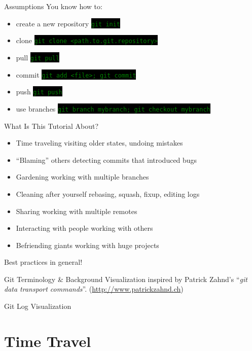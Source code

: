 \documentclass[
14pt,
aspectratio=169,
usenames,
dvipsnames,
x11names]{beamer}
\newcommand{\code}[1]{{\small\setlength{\fboxsep}{2pt}\colorbox{black}{\textcolor{green}{\texttt{#1}}}}}
\newcommand{\buz}[2]{#1 \hfill \textcolor{Gray!50}{#2}}
\begin{document}
\begin{frame}{Assumptions}
  \alert{You} know how to:
  \begin{itemize}
  \item create a new repository \hfill \code{git init}
  \item clone \hfill \code{git clone <path.to.git.repository>}
  \item pull \hfill \code{git pull}
  \item commit \hfill \code{git add <file>; git commit}
  \item push \hfill \code{git push}
  \item use branches \hfill \code{git branch mybranch; git checkout mybranch}
  \end{itemize}
\end{frame}

\begin{frame}{What Is This Tutorial About?}
  \begin{itemize} \setlength{\itemsep}{\fill}
  \item \buz{Time traveling}{visiting older states, undoing mistakes}
  \item \buz{``Blaming'' others}{detecting commits that introduced bugs}
  \item \buz{Gardening}{working with multiple branches}
  \item \buz{Cleaning after yourself}{rebasing, squash, fixup, editing logs}
  \item \buz{Sharing}{working with multiple remotes}
  \item \buz{Interacting with people}{working with others}
  \item \buz{Befriending giants}{working with huge projects}
  \end{itemize}
  \centering
  \alert{Best practices} in general!
\end{frame}

\begin{frame}{Git Terminology \& Background}
  \centering
  \tiny
  Visualization inspired by Patrick Zahnd's ``\textit{git data transport commands}''. (\url{http://www.patrickzahnd.ch})
  \vfill
  \scriptsize
  
\end{frame}

\begin{frame}{Git Log Visualization}
  \centering
  
\end{frame}

\section{Time Travel}
\end{document}
